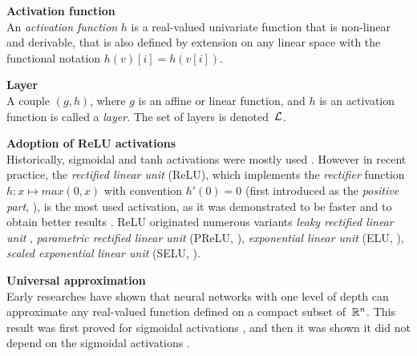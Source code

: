 \begin{definition}\textbf{Activation function}\\
An \emph{activation function} $h$ is a real-valued univariate function that is non-linear and derivable, that is also defined by extension on any linear space with the functional notation $h(v)[i] = h(v[i])$.
\end{definition}
%

\begin{definition}\textbf{Layer}\\
A couple $(g,h)$, where $g$ is an affine or linear function, and $h$ is an activation function is called a \emph{layer}. The set of layers is denoted~$\mathcal{L}$.
\end{definition}

\begin{remark}\textbf{Adoption of ReLU activations}\\
Historically, sigmoidal and tanh activations were mostly used \citep{cybenko1989approximation, lecun1989backpropagation}. However in recent practice, the \emph{rectified linear unit} (ReLU), which implements the \emph{rectifier} function $h: x \mapsto max(0,x)$ with convention $h'(0) = 0$ (first introduced as the \emph{positive part}, \cite{jarrett2009best}), is the most used activation, as it was demonstrated to be faster and to obtain better results \citep{glorot2011deep}. ReLU originated numerous variants \eg \emph{leaky rectified linear unit} \citep{maas2013rectifier}, \emph{parametric rectified linear unit} (PReLU, \cite{he2015delving}), \emph{exponential linear unit} (ELU, \cite{clevert2015fast}), \emph{scaled exponential linear unit} (SELU, \cite{Klambauer2017self}).
\end{remark}

\begin{remark}\textbf{Universal approximation}\\
Early researches have shown that neural networks with one level of depth can approximate any real-valued function defined on a compact subset of~$\mathbb{R}^n$. This result was first proved for sigmoidal activations \citep{cybenko1989approximation}, and then it was shown it did not depend on the sigmoidal activations \citep{hornik1989multilayer,hornik1991approximation}.
\end{remark}

